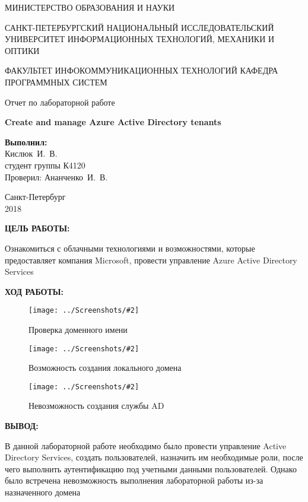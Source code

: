 \documentclass[14pt,a4paper]{extreport}
\newcommand{\screenshot}[2]{\begin{figure}[ht]%
\centering\texttt{[image: ../Screenshots/\#2]}%
\caption{#1}%
\label{picture#2}%
\end{figure}%
}
\newcommand{\header}[1]{%
{
\fontsize{16pt}{14pt}\selectfont
\begin{center}
\textbf{\MakeUppercase{#1}:}
\end{center}
}
}
\newcommand{\prepod}{Ананченко~И.~В.}
\newcommand{\igork}{Кислюк~И.~В.}
\begin{document}
	\begin{titlepage}
	\begin{center}	
		\fontsize{14pt}{14pt}\selectfont
		МИНИСТЕРСТВО ОБРАЗОВАНИЯ И НАУКИ\\

		\vspace*{0.6\baselineskip}
		
		САНКТ-ПЕТЕРБУРГСКИЙ НАЦИОНАЛЬНЫЙ ИССЛЕДОВАТЕЛЬСКИЙ УНИВЕРСИТЕТ ИНФОРМАЦИОННЫХ ТЕХНОЛОГИЙ, МЕХАНИКИ И ОПТИКИ
		
		\vspace*{0.6\baselineskip}
		ФАКУЛЬТЕТ ИНФОКОММУНИКАЦИОННЫХ ТЕХНОЛОГИЙ
		КАФЕДРА ПРОГРАММНЫХ СИСТЕМ
	
		\vspace*{7\baselineskip}
		\fontsize{19pt}{18pt}\selectfont
		Отчет по лабораторной работе
		
		\fontsize{20pt}{18pt}\selectfont
		\textbf{Create and manage Azure Active Directory tenants}\\
		\vspace*{1.15\baselineskip}
		\end{center}
	
	\vspace*{2\baselineskip}
	\begin{flushright}
	\fontsize{14pt}{14pt}\selectfont
	\textbf{Выполнил:}\\
	\igork\\
	студент группы К4120\\
	Проверил: \prepod\\
	\end{flushright}
	
	\vspace{\fill}
	\begin{center}
	Санкт-Петербург\\
	2018
	\end{center}
	
\end{titlepage}

\newpage

\header{Цель работы}

\fontsize{14pt}{14pt}\selectfont

Ознакомиться с облачными технологиями и возможностями, которые предоставляет компания Microsoft, провести управление Azure Active Directory Services
\clearpage

\header{Ход работы}

\screenshot{Проверка доменного имени}{1}
\screenshot{Возможность создания локального домена}{2}
\screenshot{Невозможность создания службы AD}{3}

\clearpage
\header{Вывод}

В данной лабораторной работе необходимо было провести управление Active Directory Services, создать пользователей, назначить им необходимые роли, после чего выполнить аутентификацию под учетными данными пользователей. Однако было встречена невозможность выполнения лабораторной работы из-за назначенного домена
\end{document}
